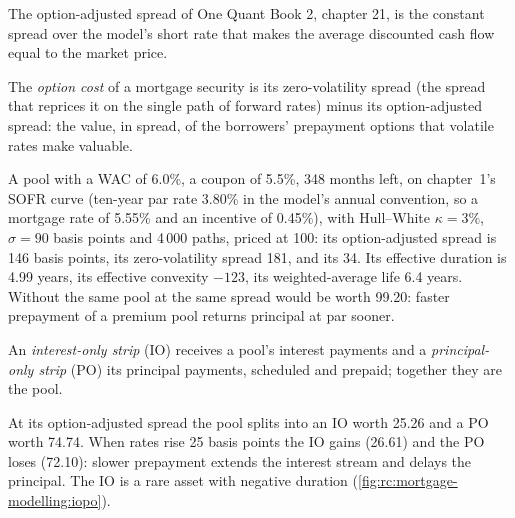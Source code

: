 The option-adjusted spread of One Quant Book 2, chapter 21, is the constant spread
over the model's short rate that makes the average discounted cash flow equal to
the market price.

\begin{definition}\label{def:rc:mortgage-modelling:optioncost}
The \emph{option cost} of a mortgage security is its
zero-volatility spread (the spread that reprices it on the single path of forward
rates) minus its option-adjusted spread: the value, in spread, of the borrowers'
prepayment options that volatile rates make valuable.
\end{definition}

\begin{example}\label{ex:rc:mortgage-modelling:oas}
A pool with a WAC of 6.0\%, a coupon of 5.5\%, 348 months left, on chapter~1's SOFR curve
(ten-year par rate 3.80\% in the model's annual convention, so a mortgage rate of 5.55\% and an incentive of 0.45\%), with
Hull--White $\kappa = 3\%$, $\sigma = 90$ basis points and 4\,000 paths, priced at 100: its
option-adjusted spread is 146 basis points, its zero-volatility spread 181, and its
 34. Its effective duration is 4.99 years, its effective convexity $-123$, its
weighted-average life 6.4 years. Without  the same pool at the same spread would
be worth 99.20: faster prepayment of a premium pool returns principal at par sooner.
\end{example}

\begin{definition}\label{def:rc:mortgage-modelling:iopo}
An \emph{interest-only strip} (IO) receives a pool's interest
payments and a \emph{principal-only strip} (PO) its principal
payments, scheduled and prepaid; together they are the pool.
\end{definition}

\begin{example}\label{ex:rc:mortgage-modelling:iopo}
At its option-adjusted spread the pool splits into an IO worth 25.26 and a PO worth
74.74. When rates rise 25 basis points the IO gains (26.61) and the PO loses (72.10):
slower prepayment extends the interest stream and delays the principal. The IO is a
rare asset with negative duration (\cref{fig:rc:mortgage-modelling:iopo}).
\end{example}

